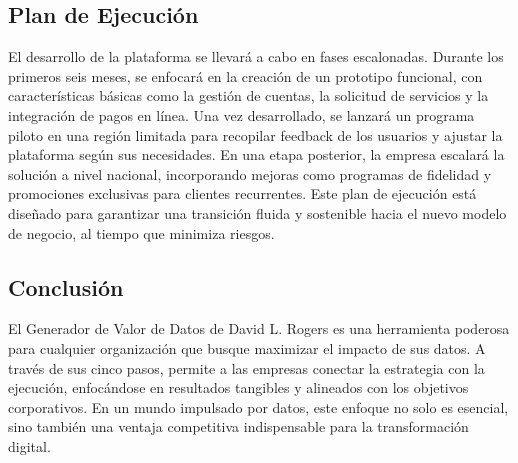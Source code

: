 	\subsection{Plan de Ejecución}

	El desarrollo de la plataforma se llevará a cabo en fases escalonadas. Durante
	los primeros seis meses, se enfocará en la creación de un prototipo funcional,
	con características básicas como la gestión de cuentas, la solicitud de
	servicios y la integración de pagos en línea. Una vez desarrollado, se lanzará
	un programa piloto en una región limitada para recopilar feedback de los
	usuarios y ajustar la plataforma según sus necesidades. En una etapa posterior,
	la empresa escalará la solución a nivel nacional, incorporando mejoras como programas
	de fidelidad y promociones exclusivas para clientes recurrentes. Este plan de
	ejecución está diseñado para garantizar una transición fluida y sostenible
	hacia el nuevo modelo de negocio, al tiempo que minimiza riesgos.

	\clearpage
	\subsection*{Conclusión}

	El Generador de Valor de Datos de David L. Rogers es una herramienta poderosa
	para cualquier organización que busque maximizar el impacto de sus datos. A través
	de sus cinco pasos, permite a las empresas conectar la estrategia con la
	ejecución, enfocándose en resultados tangibles y alineados con los objetivos corporativos.
	En un mundo impulsado por datos, este enfoque no solo es esencial, sino
	también una ventaja competitiva indispensable para la transformación digital.


	\nocite{*} %

	\clearpage
	

	

